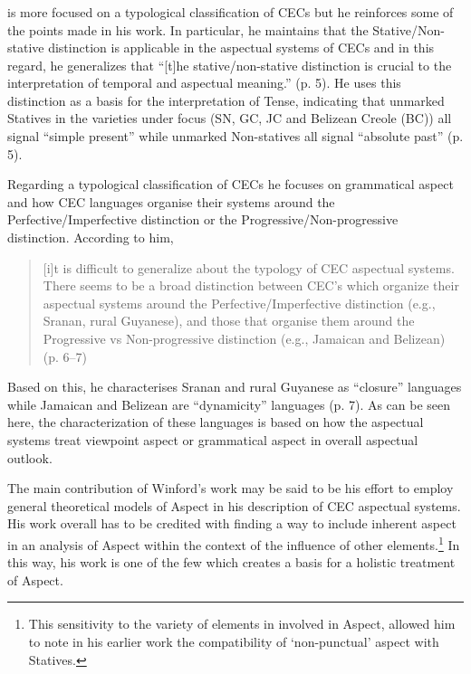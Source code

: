 \subsubsection{\citet{Winford2001}}\label{sec:2.1.5.1}

\citet{Winford2001} is more focused on a typological classification of
CECs but he reinforces some of the points made in his \citeyear{Winford1993} work.  In
particular, he maintains that the Stative\slash Non-stative distinction is
applicable in the aspectual systems of CECs and in this regard, he
generalizes that “[t]he stative\slash non-stative distinction is crucial to
the interpretation of temporal and aspectual meaning.” (p. 5).  He
uses this distinction as a basis for the interpretation of Tense,
indicating that unmarked Statives in the varieties under focus (SN,
GC, JC and Belizean Creole (BC)) all signal “simple present” while
unmarked Non-statives all signal “absolute past” (p. 5).

Regarding a typological classification of CECs he focuses on
grammatical aspect and how CEC languages organise their systems around
the Perfective\slash Imper\-fective distinction or the
Progressive\slash Non-progressive distinction.  According to him,

\begin{quote}
[i]t is difficult to generalize about the typology of CEC aspectual
systems. There seems to be a broad distinction between CEC’s which
organize their aspectual systems around the Perfective\slash Imperfective
distinction (e.g., Sranan, rural Guyanese), and those that organise
them around the Progressive vs Non-progressive distinction (e.g.,
Jamaican and Belizean) (p. 6--7)
\end{quote}

Based on this, he characterises Sranan and rural Guyanese as “closure”
languages while Jamaican and Belizean are “dynamicity” languages
(p. 7). As can be seen here, the characterization of these languages
is based on how the aspectual systems treat viewpoint aspect or
grammatical aspect in overall aspectual outlook.

The main contribution of Winford’s work may be said to be his effort
to employ general theoretical models of Aspect in his description of
CEC aspectual systems.  His work overall has to be credited with
finding a way to include inherent aspect in an analysis of Aspect
within the context of the influence of other elements.\footnote{This
  sensitivity to the variety of elements in involved in Aspect,
  allowed him to note in his earlier work \citep[389]{Winford2000} the
  compatibility of ‘non-punctual’ aspect with Statives.} In this
way, his work is one of the few which creates a basis for a holistic
treatment of Aspect.

